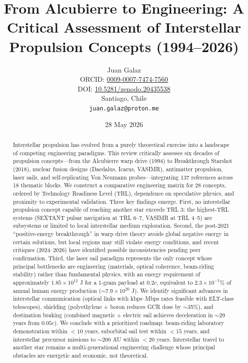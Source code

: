 \documentclass[11pt,a4paper,onecolumn]{article}
\title{{\bfseries From Alcubierre to Engineering: A Critical Assessment of Interstellar Propulsion Concepts (1994--2026)}}
\author{Juan Galaz\\[2mm]
\small ORCID: \href{https://orcid.org/0009-0007-7474-7560}{0009-0007-7474-7560}\\
\small DOI: \href{https://doi.org/10.5281/zenodo.20435538}{10.5281/zenodo.20435538}\\
\small Santiago, Chile\\
\small \texttt{juan.galaz@proton.me}}
\date{28 May 2026}
\begin{document}
\maketitle

\begin{abstract}
Interstellar propulsion has evolved from a purely theoretical exercise into a landscape of competing engineering paradigms. This review critically assesses six decades of propulsion concepts---from the Alcubierre warp drive (1994) to Breakthrough Starshot (2018), nuclear fusion designs (Daedalus, Icarus, VASIMR), antimatter propulsion, laser sails, and self-replicating Von Neumann probes---integrating 137 references across 18 thematic blocks. We construct a comparative engineering matrix for 28 concepts, ordered by Technology Readiness Level (TRL), dependence on speculative physics, and proximity to experimental validation. Three key findings emerge. First, no interstellar propulsion concept capable of reaching another star exceeds TRL 3; the highest-TRL systems (SEXTANT pulsar navigation at TRL 6--7, VASIMR at TRL 4--5) are subsystems or limited to local interstellar medium exploration. Second, the post-2021 ``positive-energy breakthrough'' in warp drive theory avoids global negative energy in certain solutions, but local regions may still violate energy conditions, and recent critiques (2024--2026) have identified possible inconsistencies pending peer confirmation. Third, the laser sail paradigm represents the only concept whose principal bottlenecks are engineering (materials, optical coherence, beam-riding stability) rather than fundamental physics, with an energy requirement of approximately $1.85\times10^{12}$ J for a 1-gram payload at $0.2c$, equivalent to $2.3\times10^{-7}$\% of annual human energy production ($\sim7.9\times10^{20}$ J). We identify significant advances in interstellar communication (optical links with kbps--Mbps rates feasible with ELT-class telescopes), shielding (polyethylene + boron reduces GCR dose by $\sim$35\%), and destination braking (combined magnetic + electric sail achieves deceleration in $\sim$29 years from $0.05c$). We conclude with a prioritized roadmap: beam-riding laboratory demonstration within $<10$ years, suborbital sail test within $<15$ years, and interstellar precursor missions to $\sim200$ AU within $<20$ years. Interstellar travel to another star remains a multi-generational engineering challenge whose principal obstacles are energetic and economic, not theoretical.
\end{abstract}
\end{document}

